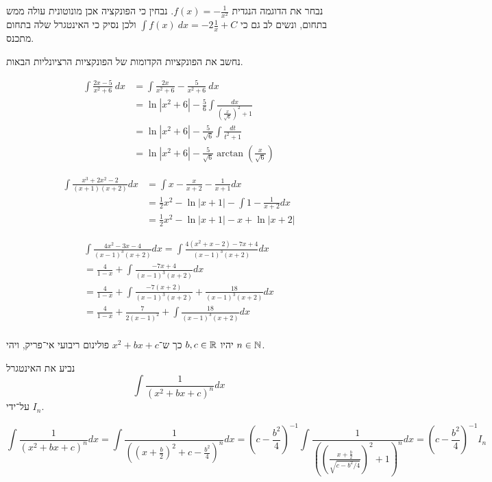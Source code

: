 נבחר את הדוגמה הנגדית $f(x) = -\frac{1}{x^2}$.
נבחין כי הפונקציה אכן מונוטונית עולה ממש בתחום, ונשים לב גם כי $\int f(x)\ dx = -2 \frac{1}{x} + C$ ולכן נסיק כי האינטגרל שלה בתחום מתכנס.

\Question{}
נחשב את הפונקציות הקדומות של הפונקציות הרציונליות הבאות.

\Subquestion{}
\begin{align*}
	\int \frac{2x - 5}{x^2 + 6}\ dx
	& = \int \frac{2x}{x^2 + 6} - \frac{5}{x^2 + 6}\ dx \\
	& = \ln |x^2 + 6| - \frac{5}{6} \int \frac{dx}{{(\frac{x}{\sqrt{6}})}^2 + 1} \\
	& = \ln |x^2 + 6| - \frac{5}{\sqrt{6}} \int \frac{dt}{t^2 + 1} \\
	& = \ln |x^2 + 6| - \frac{5}{\sqrt{6}} \arctan(\frac{x}{\sqrt{6}})
\end{align*}

\Subquestion{}
\begin{align*}
	\int \frac{x^3 + 2x^2 - 2}{(x + 1)(x + 2)}dx
	& = \int x - \frac{x}{x + 2} - \frac{1}{x + 1} dx \\
	& = \frac{1}{2} x^2 - \ln|x + 1| - \int 1 - \frac{1}{x + 2} dx \\
	& = \frac{1}{2} x^2 - \ln|x + 1| - x + \ln|x + 2|
\end{align*}

\Subquestion{}
\begin{align*}
	\int \frac{4x^2 - 3x - 4}{{(x - 1)}^3 (x + 2)} dx
	= \int \frac{4(x^2 + x - 2) - 7x + 4}{{(x - 1)}^3 (x + 2)} dx \\
	= \frac{4}{1 - x} + \int \frac{- 7x + 4}{{(x - 1)}^3 (x + 2)} dx \\
	= \frac{4}{1 - x} + \int \frac{- 7(x + 2)}{{(x - 1)}^3 (x + 2)} + \frac{18}{{(x - 1)}^3 (x + 2)} dx \\
	= \frac{4}{1 - x} + \frac{7}{2{(x - 1)}^2} + \int \frac{18}{{(x - 1)}^3 (x + 2)} dx \\
\end{align*}

\Question{}
יהיו $b, c \in \mathbb{R}$ כך ש־$x^2 + bx + c$ פולינום ריבועי אי־פריק, ויהי $n \in \mathbb{N}$.

\Subquestion{}
נביע את האינטגרל
\[
	\int \frac{1}{{(x^2 + bx + c)}^n} dx
\]
על־ידי $I_n$.

\[
	\int \frac{1}{{(x^2 + bx + c)}^n} dx
	= \int \frac{1}{{({(x + \frac{b}{2})}^2 + c - \frac{b^2}{4})}^n} dx
	= {(c - \frac{b^2}{4})}^{-1} \int \frac{1}{{({(\frac{x + \frac{b}{2}}{\sqrt{c - b^2/4}})}^2 + 1)}^n} dx
	= {(c - \frac{b^2}{4})}^{-1} I_n
\]

